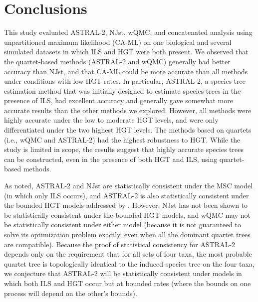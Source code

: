 \section{Conclusions}
This study evaluated ASTRAL-2, NJst, wQMC, and 
concatenated analysis using unpartitioned maximum likelihood 
(CA-ML) on one 
biological and several simulated datasets in which ILS and HGT were both present.
We observed that the quartet-based methods (ASTRAL-2 and wQMC) generally had
better accuracy than NJst, and that CA-ML could be more accurate than
all methods under conditions with low HGT rates.
In particular, ASTRAL-2, a species tree 
estimation method that was initially 
designed to estimate species trees in the presence of ILS,
had excellent accuracy and generally gave somewhat more accurate
results than the other methods we explored.  However,
all methods were highly accurate under the 
low to moderate HGT levels, and were only differentiated under the two highest HGT levels. 
The methods based on quartets (i.e., wQMC and ASTRAL-2) had the highest robustness to HGT.
While the study is limited in scope, the results suggest that highly accurate species trees can be constructed, even in the presence of both HGT and ILS, using quartet-based methods.

As noted, 
ASTRAL-2 and NJst  are statistically consistent under the MSC model (in which only ILS occurs), and ASTRAL-2 is also statistically consistent
under the bounded HGT models addressed by \cite{RochSnir}. 
However, NJst has not been shown to be statistically consistent 
under the bounded HGT models, and wQMC may not be statistically
consistent under either model (because it is not guaranteed to
solve its optimization problem exactly, 
even when all the dominant quartet trees are compatible).
Because the proof of statistical consistency for ASTRAL-2
depends only on the requirement that for all sets of four
taxa, the most probable quartet tree is
topologically identical to the induced species tree on the four taxa, 
we conjecture that
ASTRAL-2 will be statistically consistent under models in which both ILS and HGT occur but
at bounded rates (where the bounds on one process will depend on the other's bounds).

